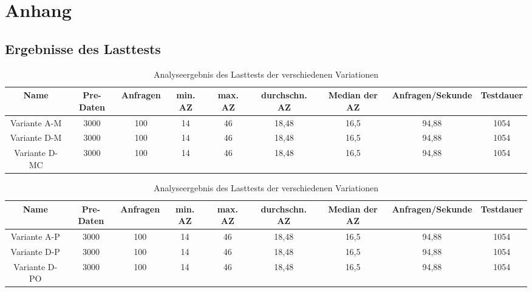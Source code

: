 
\chapter{Anhang}

\section{Ergebnisse des Lasttests}


\begin{landscape}
\begin{table}[h!]
	\centering
	\small
	\begin{tabular}{ |c|c|c|c|c|c|c|c|c|} 
		\hline
		Name & Pre-Daten & Anfragen & min. AZ & max. AZ & durchschn. AZ & Median der AZ & Anfragen/Sekunde & Testdauer \\ 
		\hline
		Variante A-M & 3000 & 100 & 14 & 46 & 18,48 & 16,5 & 94,88 & 1054 \\ 
		\hline
		Variante D-M & 3000 & 100 & 14 & 46 & 18,48 & 16,5 & 94,88 & 1054 \\ 
		\hline
		Variante D-MC & 3000 & 100 & 14 & 46 & 18,48 & 16,5 & 94,88 & 1054 \\ 
		\hline
		\hline
	\end{tabular}
	\caption{Analyseergebnis des Lasttests der verschiedenen Variationen}
	\label{fig:performance-mongo}
\end{table}
\end{landscape}

\begin{landscape}
	\begin{table}[h!]
		\centering
		\small
		\begin{tabular}{ |c|c|c|c|c|c|c|c|c|} 
			\hline
			Name & Pre-Daten & Anfragen & min. AZ & max. AZ & durchschn. AZ & Median der AZ & Anfragen/Sekunde & Testdauer \\ 
			\hline
			Variante A-P & 3000 & 100 & 14 & 46 & 18,48 & 16,5 & 94,88 & 1054 \\ 
			\hline
			Variante D-P & 3000 & 100 & 14 & 46 & 18,48 & 16,5 & 94,88 & 1054 \\ 
			\hline
			Variante D-PO & 3000 & 100 & 14 & 46 & 18,48 & 16,5 & 94,88 & 1054 \\ 
			\hline
		\end{tabular}
		\caption{Analyseergebnis des Lasttests der verschiedenen Variationen}
		\label{fig:performance-postgres}
	\end{table}
\end{landscape}
